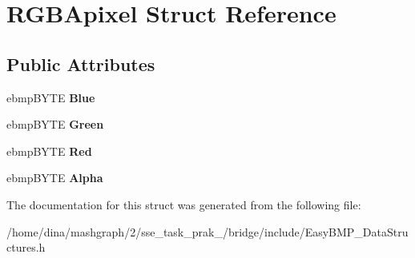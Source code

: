\hypertarget{struct_r_g_b_apixel}{\section{R\-G\-B\-Apixel Struct Reference}
\label{struct_r_g_b_apixel}
}
\subsection*{Public Attributes}
\begin{DoxyCompactItemize}
\item 
\hypertarget{struct_r_g_b_apixel_af12bfb2ddd00995b59ef07e4e77c11af}{ebmp\-B\-Y\-T\-E {\bfseries Blue}}\label{struct_r_g_b_apixel_af12bfb2ddd00995b59ef07e4e77c11af}

\item 
\hypertarget{struct_r_g_b_apixel_a9a9cd569a585a627910620a7b13690e7}{ebmp\-B\-Y\-T\-E {\bfseries Green}}\label{struct_r_g_b_apixel_a9a9cd569a585a627910620a7b13690e7}

\item 
\hypertarget{struct_r_g_b_apixel_a0d2e09cc0a67fd3da76b17289146fc26}{ebmp\-B\-Y\-T\-E {\bfseries Red}}\label{struct_r_g_b_apixel_a0d2e09cc0a67fd3da76b17289146fc26}

\item 
\hypertarget{struct_r_g_b_apixel_a531e2866b6daa3975738cdd37db6270c}{ebmp\-B\-Y\-T\-E {\bfseries Alpha}}\label{struct_r_g_b_apixel_a531e2866b6daa3975738cdd37db6270c}

\end{DoxyCompactItemize}


The documentation for this struct was generated from the following file\-:\begin{DoxyCompactItemize}
\item 
/home/dina/mashgraph/2/sse\-\_\-task\-\_\-prak\-\_/bridge/include/Easy\-B\-M\-P\-\_\-\-Data\-Structures.\-h\end{DoxyCompactItemize}

